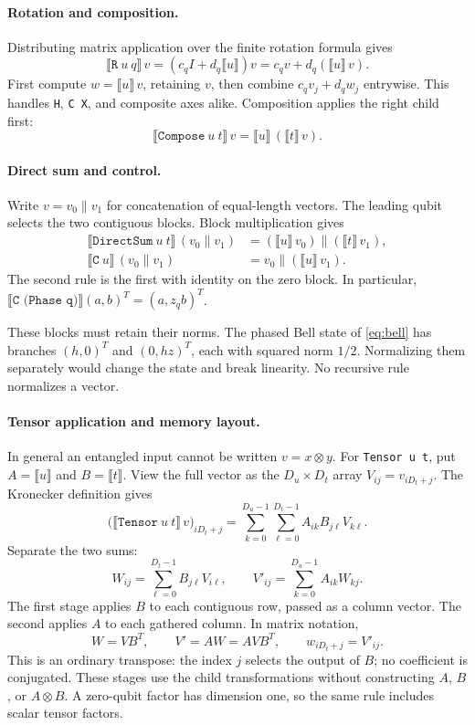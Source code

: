 \documentclass[11pt,a4paper]{article}
\newcommand{\sem}[1]{\llbracket #1\rrbracket}
\newcommand{\code}[1]{\texttt{#1}}
\begin{document}
\paragraph{Rotation and composition.}
Distributing matrix application over the finite rotation formula gives
\begin{equation}
\sem{\code{R}\ u\ q}\,v
=(c_qI+d_q\sem u)v
=c_qv+d_q(\sem u\,v).
\label{eq:svrotation}
\end{equation}
First compute $w=\sem u\,v$, retaining $v$, then combine $c_qv_j+d_qw_j$
entrywise. This handles \code{H}, \code{C X}, and composite axes alike.
Composition applies the right child first:
\[
\sem{\code{Compose}\ u\ t}\,v=\sem u\,(\sem t\,v).
\]

\paragraph{Direct sum and control.}
Write $v=v_0\mathbin{\|}v_1$ for concatenation of equal-length vectors.
The leading qubit selects the two contiguous blocks. Block multiplication gives
\begin{align}
\sem{\code{DirectSum}\ u\ t}\,(v_0\mathbin{\|}v_1)
 &=(\sem u\,v_0)\mathbin{\|}(\sem t\,v_1),\\
\sem{\code{C}\ u}\,(v_0\mathbin{\|}v_1)
 &=v_0\mathbin{\|}(\sem u\,v_1).
\end{align}
The second rule is the first with identity on the zero block.
In particular, $\sem{\code{C (Phase q)}}(a,b)^T=(a,z_qb)^T$.

These blocks must retain their norms. The phased Bell state of
\eqref{eq:bell} has branches $(h,0)^T$ and $(0,hz)^T$, each with squared
norm $1/2$. Normalizing them separately would change the state and break
linearity. No recursive rule normalizes a vector.

\paragraph{Tensor application and memory layout.}
\label{sec:layout}
In general an entangled input cannot be written $v=x\otimes y$.
For \code{Tensor u t}, put $A=\sem u$ and $B=\sem t$.
View the full vector as the $D_u\times D_t$ array
$V_{ij}=v_{iD_t+j}$. The Kronecker definition gives
\begin{equation}
\bigl(\sem{\code{Tensor}\ u\ t}\,v\bigr)_{iD_t+j}
 =\sum_{k=0}^{D_u-1}\sum_{\ell=0}^{D_t-1}A_{ik}B_{j\ell}V_{k\ell}.
\label{eq:tensoraction}
\end{equation}
Separate the two sums:
\[
W_{ij}=\sum_{\ell=0}^{D_t-1}B_{j\ell}V_{i\ell},
\qquad
V'_{ij}=\sum_{k=0}^{D_u-1}A_{ik}W_{kj}.
\]
The first stage applies $B$ to each contiguous row, passed as a column
vector. The second applies $A$ to each gathered column. In matrix notation,
\begin{equation}
W=VB^T,\qquad V'=AW=AVB^T,\qquad
w_{iD_t+j}=V'_{ij}.
\label{eq:svlayout}
\end{equation}
This is an ordinary transpose: the index $j$ selects the output of $B$;
no coefficient is conjugated. These stages use the child transformations
without constructing $A$, $B$, or $A\otimes B$. A zero-qubit factor has
dimension one, so the same rule includes scalar tensor factors.
\end{document}
